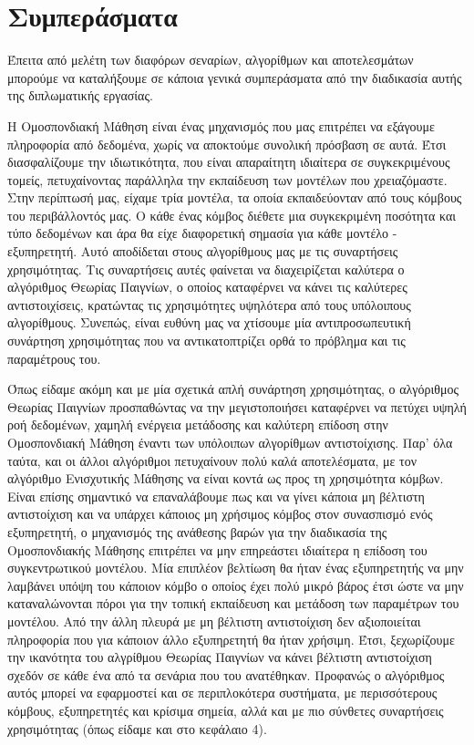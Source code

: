 \chapter{Συμπεράσματα}

Έπειτα από μελέτη των διαφόρων σεναρίων, αλγορίθμων και αποτελεσμάτων μπορούμε να καταλήξουμε σε κάποια γενικά συμπεράσματα από την διαδικασία αυτής της διπλωματικής εργασίας.

Η Ομοσπονδιακή Μάθηση είναι ένας μηχανισμός που μας επιτρέπει να εξάγουμε πληροφορία από δεδομένα, χωρίς να αποκτούμε συνολική πρόσβαση σε αυτά. Έτσι διασφαλίζουμε την ιδιωτικότητα, που είναι απαραίτητη ιδιαίτερα σε συγκεκριμένους τομείς, πετυχαίνοντας παράλληλα την εκπαίδευση των μοντέλων που χρειαζόμαστε. Στην περίπτωσή μας, είχαμε τρία μοντέλα, τα οποία εκπαιδεύονταν από τους κόμβους του περιβάλλοντός μας. Ο κάθε ένας κόμβος διέθετε μια συγκεκριμένη ποσότητα και τύπο δεδομένων και άρα θα είχε διαφορετική σημασία για κάθε μοντέλο - εξυπηρετητή. Αυτό αποδίδεται στους αλγορίθμους μας με τις συναρτήσεις χρησιμότητας. Τις συναρτήσεις αυτές φαίνεται να διαχειρίζεται καλύτερα ο αλγόριθμος Θεωρίας Παιγνίων, ο οποίος καταφέρνει να κάνει τις καλύτερες αντιστοιχίσεις, κρατώντας τις χρησιμότητες υψηλότερα από τους υπόλοιπους αλγορίθμους. Συνεπώς, είναι ευθύνη μας να χτίσουμε μία αντιπροσωπευτική συνάρτηση χρησιμότητας που να αντικατοπτρίζει ορθά το πρόβλημα και τις παραμέτρους του. 

Όπως είδαμε ακόμη και με μία σχετικά απλή συνάρτηση χρησιμότητας, ο αλγόριθμος Θεωρίας Παιγνίων προσπαθώντας να την μεγιστοποιήσει καταφέρνει να πετύχει υψηλή ροή δεδομένων, χαμηλή ενέργεια μετάδοσης και καλύτερη επίδοση στην Ομοσπονδιακή Μάθηση έναντι των υπόλοιπων αλγορίθμων αντιστοίχισης. Παρ' όλα ταύτα, και οι άλλοι αλγόριθμοι πετυχαίνουν πολύ καλά αποτελέσματα, με τον αλγόριθμο Ενισχυτικής Μάθησης να είναι κοντά ως προς τη χρησιμότητα κόμβων. Είναι επίσης σημαντικό να επαναλάβουμε πως και να γίνει κάποια μη βέλτιστη αντιστοίχιση και να υπάρχει κάποιος μη χρήσιμος κόμβος στον συνασπισμό ενός εξυπηρετητή, ο μηχανισμός της ανάθεσης βαρών για την διαδικασία της Ομοσπονδιακής Μάθησης επιτρέπει να μην επηρεάστει ιδιαίτερα η επίδοση του συγκεντρωτικού μοντέλου. Μία επιπλέον βελτίωση θα ήταν ένας εξυπηρετητής να μην λαμβάνει υπόψη του κάποιον κόμβο ο οποίος έχει πολύ μικρό βάρος έτσι ώστε να μην καταναλώνονται πόροι για την τοπική εκπαίδευση και μετάδοση των παραμέτρων του μοντέλου. Από την άλλη πλευρά με μη βέλτιστη αντιστοίχιση δεν αξιοποιείται πληροφορία που για κάποιον άλλο εξυπηρετητή θα ήταν χρήσιμη. Έτσι, ξεχωρίζουμε την ικανότητα του αλγρίθμου Θεωρίας Παιγνίων να κάνει βέλτιστη αντιστοίχιση σχεδόν σε κάθε ένα από τα σενάρια που του ανατέθηκαν. Προφανώς ο αλγόριθμος αυτός μπορεί να εφαρμοστεί και σε περιπλοκότερα συστήματα, με περισσότερους κόμβους, εξυπηρετητές και κρίσιμα σημεία, αλλά και με πιο σύνθετες συναρτήσεις χρησιμότητας (όπως είδαμε και στο κεφάλαιο 4).

